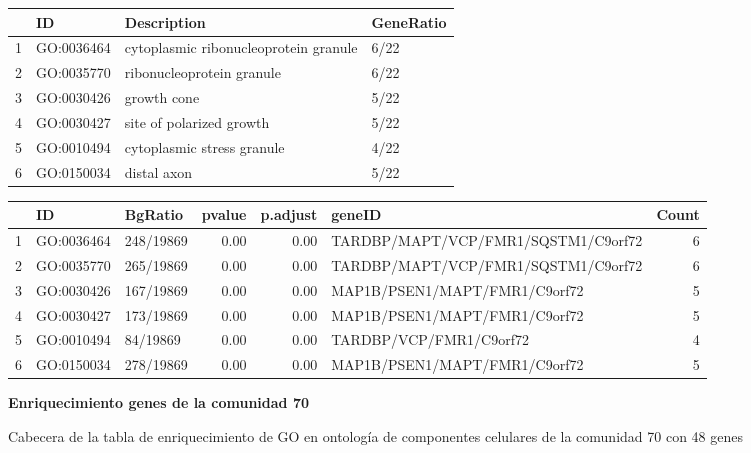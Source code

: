\hfill


\begin{table}[ht]
\centering
\begin{tabular}{rlll}
  \hline
 & ID & Description & GeneRatio \\ 
  \hline
1 & GO:0036464 & cytoplasmic ribonucleoprotein granule & 6/22 \\ 
  2 & GO:0035770 & ribonucleoprotein granule & 6/22 \\ 
  3 & GO:0030426 & growth cone & 5/22 \\ 
  4 & GO:0030427 & site of polarized growth & 5/22 \\ 
  5 & GO:0010494 & cytoplasmic stress granule & 4/22 \\ 
  6 & GO:0150034 & distal axon & 5/22 \\ 
   \hline
\end{tabular}
\end{table}

\begin{table}[ht]
\centering
\begin{tabular}{rllrrlr}
  \hline
 & ID & BgRatio & pvalue & p.adjust & geneID & Count \\ 
  \hline
1 & GO:0036464 & 248/19869 & 0.00 & 0.00 & TARDBP/MAPT/VCP/FMR1/SQSTM1/C9orf72 &   6 \\ 
  2 & GO:0035770 & 265/19869 & 0.00 & 0.00 & TARDBP/MAPT/VCP/FMR1/SQSTM1/C9orf72 &   6 \\ 
  3 & GO:0030426 & 167/19869 & 0.00 & 0.00 & MAP1B/PSEN1/MAPT/FMR1/C9orf72 &   5 \\ 
  4 & GO:0030427 & 173/19869 & 0.00 & 0.00 & MAP1B/PSEN1/MAPT/FMR1/C9orf72 &   5 \\ 
  5 & GO:0010494 & 84/19869 & 0.00 & 0.00 & TARDBP/VCP/FMR1/C9orf72 &   4 \\ 
  6 & GO:0150034 & 278/19869 & 0.00 & 0.00 & MAP1B/PSEN1/MAPT/FMR1/C9orf72 &   5 \\ 
   \hline
\end{tabular}
\end{table}

\newpage

\textbf{Enriquecimiento genes de la comunidad 70}

 Cabecera de la tabla de enriquecimiento de GO en ontología de componentes celulares de la comunidad 70 con 48 genes

\hfill

